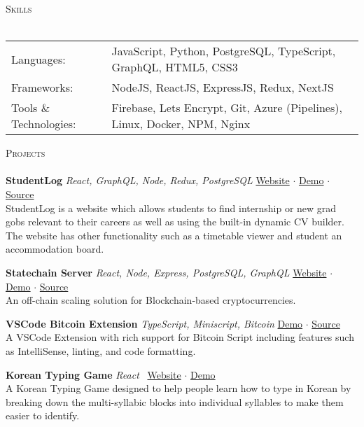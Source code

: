 \documentclass[a4paper]{article}
\newcommand{\lineunder} {
    \vspace*{-8pt} \\
    \hspace*{-18pt} \hrulefill \\
}
\newcommand{\header} [1] {
    {\hspace*{-18pt}\vspace*{6pt} \textsc{#1}}
    \vspace*{-6pt} \lineunder
}
\begin{document}
\header{Skills}
\begin{tabular}{ l l }
	Languages: & JavaScript, Python, PostgreSQL, TypeScript, GraphQL, HTML5, CSS3  \\
	Frameworks:                   & NodeJS, ReactJS, ExpressJS, Redux, NextJS             \\
	Tools \& Technologies: & Firebase, Lets Encrypt, Git, Azure (Pipelines), Linux, Docker, NPM, Nginx \\
\end{tabular}
\vspace{2mm}

\header{Projects}

{\textbf{StudentLog}} {\sl React, GraphQL, Node, Redux, PostgreSQL} \hfill \href{https://studentlog.io}{Website} $\cdot$ \href{https://www.youtube.com/watch?v=j8Ma9xcLlm0}{Demo} $\cdot$ \href{https://github.com/Kelbie/student-log}{Source}\\
StudentLog is a website which allows students to find internship or new grad gobs relevant to their careers as well as using the built-in dynamic CV builder. The website has other functionality such as a timetable viewer and student an accommodation board.\\
\vspace*{2mm}

{\textbf{Statechain Server}} {\sl React, Node, Express, PostgreSQL, GraphQL} \hfill \href{https://statechain.info}{Website} $\cdot$ \href{https://www.youtube.com/watch?v=3tdQJ4k8goE}{Demo} $\cdot$ \href{https://github.com/Kelbie/statechain-server-js}{Source}\\
An off-chain scaling solution for Blockchain-based cryptocurrencies.\\
\vspace*{2mm}

{\textbf{VSCode Bitcoin Extension}} {\sl TypeScript, Miniscript, Bitcoin} \hfill  \href{https://bitcoin-vscode.kelbie.dev}{Demo} $\cdot$ \href{https://github.com/Kelbie/vscode-bitcoin}{Source}\\
A VSCode Extension with rich support for Bitcoin Script including features such as IntelliSense, linting, and code formatting.\
\vspace*{2mm}

{\textbf{Korean Typing Game}} {\sl React} \hfill \href{https://korean.kelbie.dev/}{Website} $\cdot$ \href{https://bitcoin-vscode.kelbie.dev}{Demo} \\
A Korean Typing Game designed to help people learn how to type in Korean by breaking down the multi-syllabic blocks into individual syllables to make them easier to identify.\
\vspace*{2mm}
\end{document}

